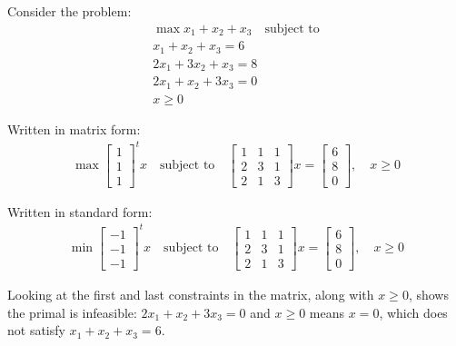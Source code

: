 \documentclass{article}
\begin{document}
\begin{example}
	Consider the problem:
	\begin{align*}
		\max x_1 + x_2 + x_3 \quad \text{subject to} \\
		x_1 + x_2 + x_3 = 6 \\
		2x_1 + 3x_2 + x_3 = 8 \\
		2x_1 + x_2 + 3x_3 = 0 \\
		x \ge 0
	\end{align*}

	Written in matrix form:
	\begin{align*}
		\max \begin{bmatrix} 1 \\ 1 \\ 1 \end{bmatrix}^t x \quad \text{subject to} \quad
		\begin{bmatrix}
			1 & 1 & 1 \\
			2 & 3 & 1 \\
			2 & 1 & 3
		\end{bmatrix} x = \begin{bmatrix} 6 \\ 8 \\ 0 \end{bmatrix}, \quad x \ge 0
	\end{align*}

	Written in standard form:
	\begin{align*}
		\min \begin{bmatrix} -1 \\ -1 \\ -1 \end{bmatrix}^t x \quad \text{subject to} \quad
		\begin{bmatrix}
			1 & 1 & 1 \\
			2 & 3 & 1 \\
			2 & 1 & 3
		\end{bmatrix} x = \begin{bmatrix} 6 \\ 8 \\ 0 \end{bmatrix}, \quad x \ge 0
	\end{align*}

	Looking at the first and last constraints in the matrix, along with $x \ge 0$, shows the primal is
	infeasible: $2x_1 + x_2 + 3x_3 = 0$ and $x \ge 0$ means $x = 0$, which does not satisfy $x_1 + x_2
		+ x_3 = 6$.


\end{example}
\end{document}
